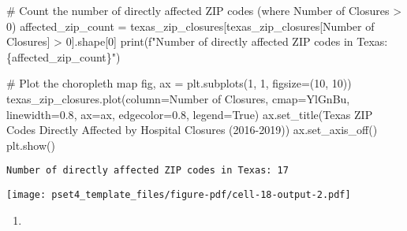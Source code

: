 \documentclass[
  letterpaper,
  DIV=11,
  numbers=noendperiod]{scrartcl}
\newenvironment{Shaded}{\begin{snugshade}}{\end{snugshade}}
\newcommand{\BuiltInTok}[1]{\textcolor[rgb]{0.00,0.23,0.31}{#1}}
\newcommand{\CommentTok}[1]{\textcolor[rgb]{0.37,0.37,0.37}{#1}}
\newcommand{\DecValTok}[1]{\textcolor[rgb]{0.68,0.00,0.00}{#1}}
\newcommand{\FloatTok}[1]{\textcolor[rgb]{0.68,0.00,0.00}{#1}}
\newcommand{\NormalTok}[1]{\textcolor[rgb]{0.00,0.23,0.31}{#1}}
\newcommand{\OperatorTok}[1]{\textcolor[rgb]{0.37,0.37,0.37}{#1}}
\newcommand{\SpecialCharTok}[1]{\textcolor[rgb]{0.37,0.37,0.37}{#1}}
\newcommand{\SpecialStringTok}[1]{\textcolor[rgb]{0.13,0.47,0.30}{#1}}
\newcommand{\StringTok}[1]{\textcolor[rgb]{0.13,0.47,0.30}{#1}}
\newcommand{\VariableTok}[1]{\textcolor[rgb]{0.07,0.07,0.07}{#1}}
\providecommand{\tightlist}{%
  \setlength{\itemsep}{0pt}\setlength{\parskip}{0pt}}\usepackage{longtable,booktabs,array}
\begin{document}
\begin{Shaded}
\begin{Highlighting}[]
\CommentTok{\# Count the number of directly affected ZIP codes (where Number of Closures \textgreater{} 0)}
\NormalTok{affected\_zip\_count }\OperatorTok{=}\NormalTok{ texas\_zip\_closures[texas\_zip\_closures[}\StringTok{\textquotesingle{}Number of Closures\textquotesingle{}}\NormalTok{] }\OperatorTok{\textgreater{}} \DecValTok{0}\NormalTok{].shape[}\DecValTok{0}\NormalTok{]}
\BuiltInTok{print}\NormalTok{(}\SpecialStringTok{f"Number of directly affected ZIP codes in Texas: }\SpecialCharTok{\{}\NormalTok{affected\_zip\_count}\SpecialCharTok{\}}\SpecialStringTok{"}\NormalTok{)}

\CommentTok{\# Plot the choropleth map}
\NormalTok{fig, ax }\OperatorTok{=}\NormalTok{ plt.subplots(}\DecValTok{1}\NormalTok{, }\DecValTok{1}\NormalTok{, figsize}\OperatorTok{=}\NormalTok{(}\DecValTok{10}\NormalTok{, }\DecValTok{10}\NormalTok{))}
\NormalTok{texas\_zip\_closures.plot(column}\OperatorTok{=}\StringTok{\textquotesingle{}Number of Closures\textquotesingle{}}\NormalTok{, cmap}\OperatorTok{=}\StringTok{\textquotesingle{}YlGnBu\textquotesingle{}}\NormalTok{, linewidth}\OperatorTok{=}\FloatTok{0.8}\NormalTok{, ax}\OperatorTok{=}\NormalTok{ax, edgecolor}\OperatorTok{=}\StringTok{\textquotesingle{}0.8\textquotesingle{}}\NormalTok{, legend}\OperatorTok{=}\VariableTok{True}\NormalTok{)}
\NormalTok{ax.set\_title(}\StringTok{\textquotesingle{}Texas ZIP Codes Directly Affected by Hospital Closures (2016{-}2019)\textquotesingle{}}\NormalTok{)}
\NormalTok{ax.set\_axis\_off()}
\NormalTok{plt.show()}
\end{Highlighting}
\end{Shaded}

\begin{verbatim}
Number of directly affected ZIP codes in Texas: 17
\end{verbatim}

\texttt{[image: pset4\_template\_files/figure-pdf/cell-18-output-2.pdf]}

\begin{enumerate}
\def\labelenumi{\arabic{enumi}.}
\setcounter{enumi}{2}
\tightlist
\item
\end{enumerate}
\end{document}
